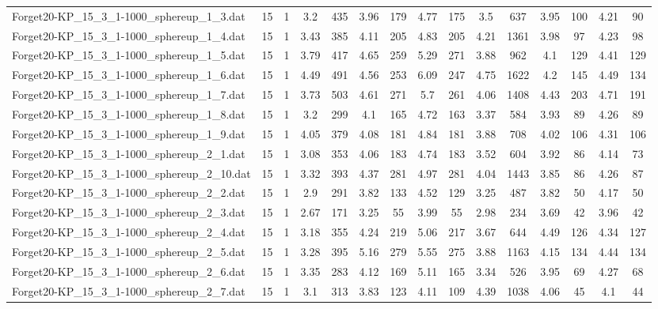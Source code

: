 \begin{table}[!ht]
{\begin{tabular}{lcccccccccccccc}
Forget20-KP\_15\_3\_1-1000\_sphereup\_1\_3.dat & 15 & 1 & 3.2 & 435 & 3.96 & 179 & 4.77 & 175 & 3.5 & 637 & 3.95 & 100 & 4.21 & 90 \\
Forget20-KP\_15\_3\_1-1000\_sphereup\_1\_4.dat & 15 & 1 & 3.43 & 385 & 4.11 & 205 & 4.83 & 205 & 4.21 & 1361 & 3.98 & 97 & 4.23 & 98 \\
Forget20-KP\_15\_3\_1-1000\_sphereup\_1\_5.dat & 15 & 1 & 3.79 & 417 & 4.65 & 259 & 5.29 & 271 & 3.88 & 962 & 4.1 & 129 & 4.41 & 129 \\
Forget20-KP\_15\_3\_1-1000\_sphereup\_1\_6.dat & 15 & 1 & 4.49 & 491 & 4.56 & 253 & 6.09 & 247 & 4.75 & 1622 & 4.2 & 145 & 4.49 & 134 \\
Forget20-KP\_15\_3\_1-1000\_sphereup\_1\_7.dat & 15 & 1 & 3.73 & 503 & 4.61 & 271 & 5.7 & 261 & 4.06 & 1408 & 4.43 & 203 & 4.71 & 191 \\
Forget20-KP\_15\_3\_1-1000\_sphereup\_1\_8.dat & 15 & 1 & 3.2 & 299 & 4.1 & 165 & 4.72 & 163 & 3.37 & 584 & 3.93 & 89 & 4.26 & 89 \\
Forget20-KP\_15\_3\_1-1000\_sphereup\_1\_9.dat & 15 & 1 & 4.05 & 379 & 4.08 & 181 & 4.84 & 181 & 3.88 & 708 & 4.02 & 106 & 4.31 & 106 \\
Forget20-KP\_15\_3\_1-1000\_sphereup\_2\_1.dat & 15 & 1 & 3.08 & 353 & 4.06 & 183 & 4.74 & 183 & 3.52 & 604 & 3.92 & 86 & 4.14 & 73 \\
Forget20-KP\_15\_3\_1-1000\_sphereup\_2\_10.dat & 15 & 1 & 3.32 & 393 & 4.37 & 281 & 4.97 & 281 & 4.04 & 1443 & 3.85 & 86 & 4.26 & 87 \\
Forget20-KP\_15\_3\_1-1000\_sphereup\_2\_2.dat & 15 & 1 & 2.9 & 291 & 3.82 & 133 & 4.52 & 129 & 3.25 & 487 & 3.82 & 50 & 4.17 & 50 \\
Forget20-KP\_15\_3\_1-1000\_sphereup\_2\_3.dat & 15 & 1 & 2.67 & 171 & 3.25 & 55 & 3.99 & 55 & 2.98 & 234 & 3.69 & 42 & 3.96 & 42 \\
Forget20-KP\_15\_3\_1-1000\_sphereup\_2\_4.dat & 15 & 1 & 3.18 & 355 & 4.24 & 219 & 5.06 & 217 & 3.67 & 644 & 4.49 & 126 & 4.34 & 127 \\
Forget20-KP\_15\_3\_1-1000\_sphereup\_2\_5.dat & 15 & 1 & 3.28 & 395 & 5.16 & 279 & 5.55 & 275 & 3.88 & 1163 & 4.15 & 134 & 4.44 & 134 \\
Forget20-KP\_15\_3\_1-1000\_sphereup\_2\_6.dat & 15 & 1 & 3.35 & 283 & 4.12 & 169 & 5.11 & 165 & 3.34 & 526 & 3.95 & 69 & 4.27 & 68 \\
Forget20-KP\_15\_3\_1-1000\_sphereup\_2\_7.dat & 15 & 1 & 3.1 & 313 & 3.83 & 123 & 4.11 & 109 & 4.39 & 1038 & 4.06 & 45 & 4.1 & 44 \\

\end{tabular}}
\end{table}
